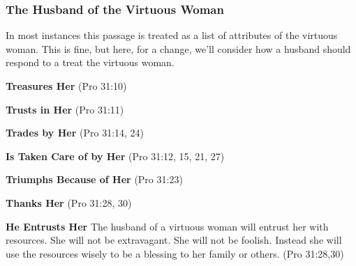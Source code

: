 \subsubsection{The Husband of the Virtuous Woman}
In most instances this passage is treated as a list of attributes of the virtuous woman. This is fine, but here, for a change, we'll consider how a husband should respond to a treat the virtuous woman.
\begin{compactenum}
    \item \textbf{Treasures Her} (Pro 31:10)
    \item \textbf{Trusts in Her} (Pro 31:11)
    \item \textbf{Trades by Her} (Pro 31:14, 24) 
    \item \textbf{Is Taken Care of by Her} (Pro 31:12, 15, 21, 27) 
    \item \textbf{Triumphs Because of Her} (Pro 31:23) 
    \item \textbf{Thanks Her} (Pro 31:28, 30) 
    \item \textbf{He Entrusts Her} The husband of a virtuous woman will entrust her with resources.  She will not be extravagant. She will not be foolish. Instead she will use the resources wisely to be a blessing to her family or others. (Pro 31:28,30) 
\end{compactenum}

